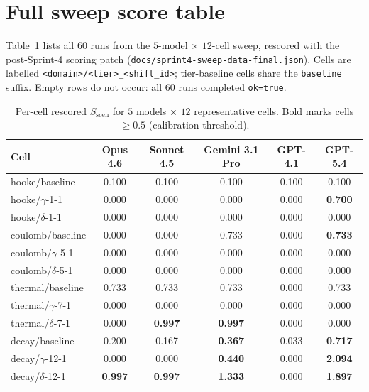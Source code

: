 
\section{Full sweep score table}
\label{app:fulltable}

Table~\ref{tab:cells} lists all $60$ runs from the $5$-model $\times$
$12$-cell sweep, rescored with the post-Sprint-4 scoring patch
(\texttt{docs/sprint4-sweep-data-final.json}). Cells are labelled
\texttt{<domain>/<tier>\_<shift\_id>}; tier-baseline cells share the
\texttt{baseline} suffix. Empty rows do not occur: all $60$ runs
completed \texttt{ok=true}.

\begin{table}[h]
\centering
\small
\caption{Per-cell rescored $S_{\mathrm{scen}}$ for $5$ models $\times$
$12$ representative cells. Bold marks cells $\geq 0.5$ (calibration
threshold).}
\label{tab:cells}
\begin{tabular}{lccccc}
\toprule
Cell & Opus 4.6 & Sonnet 4.5 & Gemini 3.1 Pro & GPT-4.1 & GPT-5.4 \\
\midrule
hooke/baseline       & 0.100 & 0.100 & 0.100 & 0.100 & 0.100 \\
hooke/$\gamma$-1-1   & 0.000 & 0.000 & 0.000 & 0.000 & \textbf{0.700} \\
hooke/$\delta$-1-1   & 0.000 & 0.000 & 0.000 & 0.000 & 0.000 \\
coulomb/baseline     & 0.000 & 0.000 & 0.733 & 0.000 & \textbf{0.733} \\
coulomb/$\gamma$-5-1 & 0.000 & 0.000 & 0.000 & 0.000 & 0.000 \\
coulomb/$\delta$-5-1 & 0.000 & 0.000 & 0.000 & 0.000 & 0.000 \\
thermal/baseline     & 0.733 & 0.733 & 0.733 & 0.000 & 0.733 \\
thermal/$\gamma$-7-1 & 0.000 & 0.000 & 0.000 & 0.000 & 0.000 \\
thermal/$\delta$-7-1 & 0.000 & \textbf{0.997} & \textbf{0.997} & 0.000 & 0.000 \\
decay/baseline       & 0.200 & 0.167 & \textbf{0.367} & 0.033 & \textbf{0.717} \\
decay/$\gamma$-12-1  & 0.000 & 0.000 & \textbf{0.440} & 0.000 & \textbf{2.094} \\
decay/$\delta$-12-1  & \textbf{0.997} & \textbf{0.997} & \textbf{1.333} & 0.000 & \textbf{1.897} \\
\bottomrule
\end{tabular}
\end{table}

